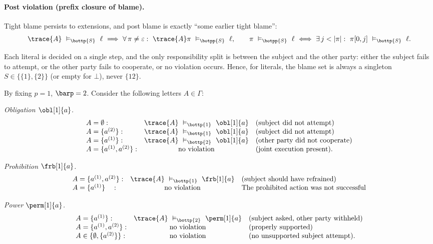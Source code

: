 \begin{definition}
\paragraph{Post violation (prefix closure of blame).}
Tight blame persists to extensions, and post blame is exactly “some earlier tight blame”:
\[
\trace{A}\ \vDash_{\bottp{S}}\ \ell\ \Longrightarrow\ 
\forall\,\pi\ne\varepsilon:\ \trace{A}\pi\ \vDash_{\botpp{S}}\ \ell,
\qquad
\pi\ \vDash_{\botpp{S}}\ \ell\ \Longleftrightarrow\ \exists\,j<|\pi|:\ \pi[0,j]\ \vDash_{\bottp{S}}\ \ell.
\]
\end{definition}

\begin{remark}
    Each literal is decided on a single step, and the only responsibility split is between the subject and the other party:
    either the subject fails to attempt, or the other party fails to cooperate, or no violation occurs. Hence, for literals, the blame set is always a singleton \(S\in\{\{1\},\{2\}\}\) (or empty for \(\bot\)), never \(\{12\}\).
\end{remark}


\begin{example}
By fixing $p=1$, $\barp=2$. Consider the following letters $A\in\Gamma$:

\smallskip
\noindent\emph{Obligation \(\obl[1]{a}\).}
\[
\begin{array}{lcl}
A=\emptyset: & \trace{A}\ \vDash_{\bottp{1}}\ \obl[1]{a} & \text{(subject did not attempt)}\\
A=\{a^{(2)}\}: & \trace{A}\ \vDash_{\bottp{1}}\ \obl[1]{a} & \text{(subject did not attempt)}\\
A=\{a^{(1)}\}: & \trace{A}\ \vDash_{\bottp{2}}\ \obl[1]{a} & \text{(other party did not cooperate)}\\
A=\{a^{(1)},a^{(2)}\}: & \text{no violation} & \text{(joint execution present).}
\end{array}
\]

\noindent\emph{Prohibition \(\frb[1]{a}\).}
\[
\begin{array}{lcl}
A=\{a^{(1)},a^{(2)}\}: & \trace{A}\ \vDash_{\bottp{1}}\ \frb[1]{a} & \text{(subject should have refrained)}\\
A=\{a^{(1)}\} \quad: & \text{no violation} & \text{The prohibited action was not successful}
\end{array}
\]

\noindent\emph{Power \(\perm[1]{a}\).}
\[
\begin{array}{lcl}
A=\{a^{(1)}\}: & \trace{A}\ \vDash_{\bottp{2}}\ \perm[1]{a} & \text{(subject asked, other party withheld)}\\
A=\{a^{(1)},a^{(2)}\}: & \text{no violation} & \text{(properly supported)}\\
A\in\{\emptyset,\{a^{(2)}\}\}: & \text{no violation} & \text{(no unsupported subject attempt).}
\end{array}
\]
\end{example}

